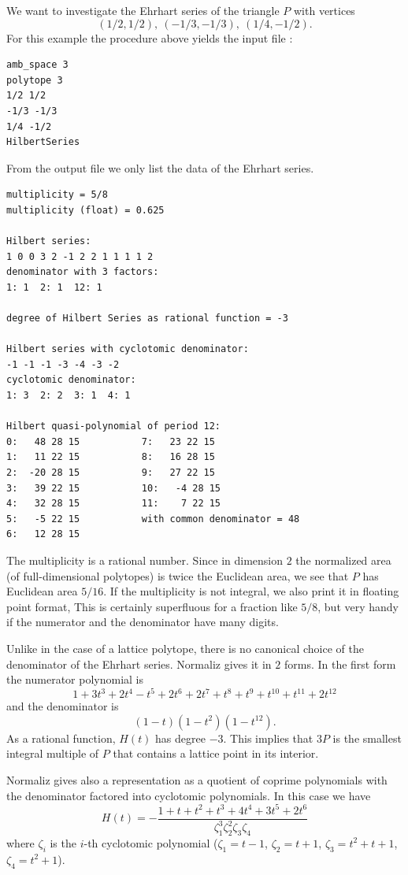 We want to investigate the Ehrhart series of the triangle $P$
with vertices
$$
(1/2,1/2),\ (-1/3,-1/3),\ (1/4,-1/2).
$$
For this example the procedure above yields the input file :

\begin{Verbatim}
amb_space 3
polytope 3
1/2 1/2
-1/3 -1/3
1/4 -1/2
HilbertSeries
\end{Verbatim}

From the output file we only list the data of the Ehrhart series.
\begin{Verbatim}
multiplicity = 5/8
multiplicity (float) = 0.625

Hilbert series:
1 0 0 3 2 -1 2 2 1 1 1 1 2 
denominator with 3 factors:
1: 1  2: 1  12: 1  

degree of Hilbert Series as rational function = -3

Hilbert series with cyclotomic denominator:
-1 -1 -1 -3 -4 -3 -2 
cyclotomic denominator:
1: 3  2: 2  3: 1  4: 1  

Hilbert quasi-polynomial of period 12:
0:   48 28 15			7:   23 22 15
1:   11 22 15			8:   16 28 15
2:  -20 28 15			9:   27 22 15
3:   39 22 15			10:   -4 28 15
4:   32 28 15			11:    7 22 15
5:   -5 22 15			with common denominator = 48
6:   12 28 15
\end{Verbatim}
The multiplicity is a rational number. Since in dimension $2$
the normalized area (of full-dimensional polytopes) is twice
the Euclidean area, we see that $P$ has Euclidean area $5/16$. If the multiplicity is not integral, we also print it in floating point format, This is certainly superfluous for a fraction like $5/8$, but very handy if the numerator and the denominator have many digits.

Unlike in the case of a lattice polytope, there is no canonical choice of the denominator of the Ehrhart series. Normaliz gives it in $2$ forms. In the first form the numerator polynomial is
$$
1+3t^3+2t^4-t^5+2t^6+2t^7+t^8+t^9+t^{10}+t^{11}+2t^{12}
$$
and the denominator is
$$
(1-t)(1-t^2)(1-t^{12}).
$$
As a rational function, $H(t)$ has degree $-3$. This implies
that $3P$ is the smallest integral multiple of $P$ that
contains a lattice point in its interior.

Normaliz gives also a representation as a quotient of coprime
polynomials with the denominator factored into cyclotomic
polynomials. In this case
we have
$$
H(t)=-\frac{1+t+t^2+t^3+4t^4+3t^5+2t^6}{\zeta_1^3\zeta_2^2\zeta_3\zeta_4}
$$
where $\zeta_i$ is the $i$-th cyclotomic polynomial
($\zeta_1=t-1$, $\zeta_2=t+1$, $\zeta_3=t^2+t+1$,
$\zeta_4=t^2+1$).

